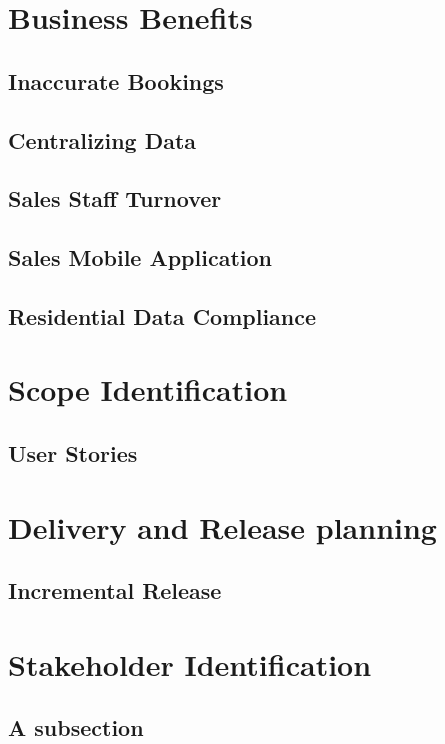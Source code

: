 \documentclass[11pt]{article} %
\begin{document}
\section{Business Benefits}
\subsection{Inaccurate Bookings}

\subsection{Centralizing Data}

\subsection{Sales Staff Turnover}

\subsection{Sales Mobile Application}

\subsection{Residential Data Compliance}

\section{Scope Identification}
\subsection{User Stories}

\section{Delivery and Release planning}
\subsection{Incremental Release}

\section{Stakeholder Identification}
\subsection{A subsection}
\end{document}
